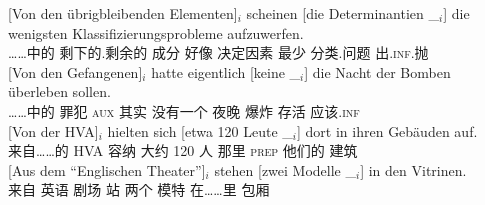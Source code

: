 \begin{sloppypar}
\eal
\ex 
\gll {}[Von den übrigbleibenden Elementen]$_i$ scheinen [die Determinantien \_$_i$] die wenigsten Klassifizierungsprobleme aufzuwerfen.\footnotemark\\
     \spacebr{}……中的  剩下的.剩余的 成分 好像 \spacebr{} 决定因素 {}  最少 分类.问题 出.\textsc{inf}.抛\\
\ex\label{bsp-von-den-gefangenen} 
\gll {}[Von den Gefangenen]$_i$ hatte eigentlich [keine \_$_i$] die Nacht der Bomben überleben sollen.\footnotemark\\
	 {}\spacebr{}……中的  罪犯 \textsc{aux} 其实 \spacebr{}没有一个 {}  夜晚  爆炸 存活 应该.\textsc{inf}\\
\ex 
\gll {}[Von der HVA]$_i$ hielten sich [etwa 120 Leute \_$_i$] dort in ihren Gebäuden auf.\footnotemark\\
	 {}\spacebr{}来自……的  HVA 容纳  \spacebr{}大约 120 人 {} 那里 \textsc{prep} 他们的 建筑 \prt{}\\
\ex 
\gll {}[Aus dem "`Englischen Theater"']$_i$ stehen [zwei Modelle \_$_i$] in den Vitrinen.\footnotemark\hspace{-3pt}\\
	 {}\spacebr{}来自  英语 剧场 站 \spacebr{}两个 模特 {} 在……里  包厢\\

\end{sloppypar}
